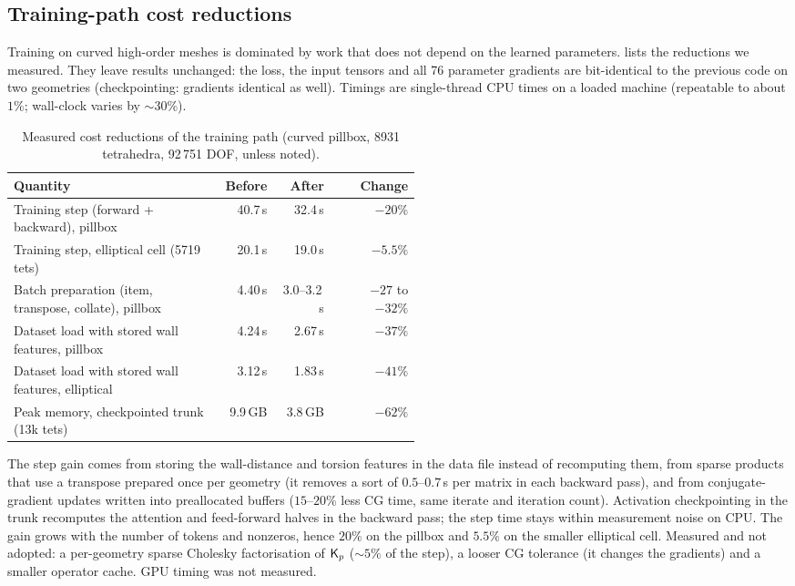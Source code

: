 \subsection{Training-path cost reductions}\label{sec:A07-engineering}
Training on curved high-order meshes is dominated by work that does not depend on the learned parameters.  lists the reductions we measured. They leave results unchanged: the loss, the input tensors and all 76 parameter gradients are bit-identical to the previous code
on two geometries (checkpointing: gradients identical as well). Timings are single-thread CPU times on a loaded machine (repeatable to about $1\%$; wall-clock varies by $\sim30\%$).

\begin{table}[t]
\centering\small
\caption{Measured cost reductions of the training path (curved pillbox, 8931 tetrahedra, 92\,751 DOF, unless noted).}
\label{tab:A07-engineering}
\begin{tabular}{p{0.52\linewidth}rrr}
\toprule
Quantity & Before & After & Change\\
\midrule
Training step (forward + backward), pillbox & 40.7\,s & 32.4\,s & $-20\%$\\
Training step, elliptical cell (5719 tets) & 20.1\,s & 19.0\,s & $-5.5\%$\\
Batch preparation (item, transpose, collate), pillbox & 4.40\,s & 3.0--3.2\,s & $-27$ to $-32\%$\\
Dataset load with stored wall features, pillbox & 4.24\,s & 2.67\,s & $-37\%$\\
Dataset load with stored wall features, elliptical & 3.12\,s & 1.83\,s & $-41\%$\\
Peak memory, checkpointed trunk (13k tets) & 9.9\,GB & 3.8\,GB & $-62\%$\\
\bottomrule
\end{tabular}
\end{table}

The step gain comes from storing the wall-distance and torsion features in the data file instead of recomputing them, from sparse products that use a transpose prepared once per geometry (it removes a sort of $0.5$--$0.7$\,s per matrix in each backward pass),
and from conjugate-gradient updates written into preallocated buffers ($15$--$20\%$ less CG time, same iterate and iteration count). Activation checkpointing in the trunk recomputes the attention and feed-forward halves in the backward pass; the step time stays within measurement noise on CPU.
The gain grows with the number of tokens and nonzeros, hence $20\%$ on the pillbox and $5.5\%$ on the smaller elliptical cell. Measured and not adopted: a per-geometry sparse Cholesky factorisation of $\Kp$ ($\sim5\%$ of the step), a looser CG tolerance (it changes the gradients) and a smaller operator cache.
GPU timing was not measured.
